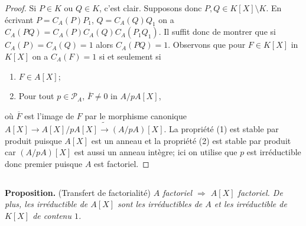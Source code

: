 \documentclass[a4paper, oneside, 12pt]{book}
\theoremstyle{definition} %
\begin{document}
\begin{proof}Si $P\in K$ ou $Q\in K$, c'est clair. Supposons donc $P,Q\in K[X]\setminus K$. En écrivant $P=C_A(P)P_1$, $Q=C_A(Q)Q_1$ on a $C_A(PQ)=C_A(P)C_A(Q)C_A(P_1Q_1)$. Il suffit donc de montrer que si $C_A(P)=C_A(Q)=1$ alors $C_A(PQ)=1$. Observons que pour $F\in K[X]$ in $K[X]$ on a  $C_A(F)=1$ si et seulement si
\begin{enumerate}
\item $F\in A[X]$;
\item  Pour tout $p\in\mathcal{P}_A$, $\overline{F}\not=0$ in $A/pA[X]$, 
\end{enumerate}
où $\overline{F}$ est l'image de $F$ par le morphisme canonique $A[X]\rightarrow A[X]/pA[X]\tilde{\rightarrow} (A/pA)[X]$. La propriété (1) est  stable par produit puisque $A[X]$ est un anneau et la propriété (2) est stable par produit car $(A/pA)[X]$ est aussi un anneau intègre; ici on utilise que $p$ est irréductible donc premier puisque $A$ est factoriel.\end{proof}
%
%



\subsection{}\label{FactTransfert}\textbf{Proposition.} (Transfert de factorialité) \textit{$A$ factoriel $\Rightarrow$ $A[X]$ factoriel. De plus, les  irréductible de $A[X]$ sont les irréductibles de $A$ et les irréductible de $K[X]$ de contenu $1$.}\\
\end{document}
